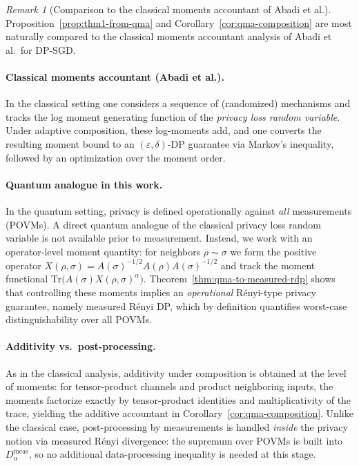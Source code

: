 \documentclass[11pt]{article}
\def\Tr{\mathrm{Tr}}
\theoremstyle{plain}
\theoremstyle{remark}
\newtheorem{remark}[theo]{Remark}
\begin{document}
\begin{remark}[Comparison to the classical moments accountant of Abadi et al.]
\label{rem:abadi-comparison}
Proposition~\ref{prop:thm1-from-qma} and Corollary~\ref{cor:qma-composition} are most
naturally compared to the classical moments accountant analysis of Abadi et al.\ for DP-SGD.

\paragraph{Classical moments accountant (Abadi et al.).}
In the classical setting one considers a sequence of (randomized) mechanisms and tracks the log
moment generating function of the \emph{privacy loss random variable}. Under adaptive composition,
these log-moments add, and one converts the resulting moment bound to an $(\varepsilon,\delta)$-DP
guarantee via Markov's inequality, followed by an optimization over the moment order.

\paragraph{Quantum analogue in this work.}
In the quantum setting, privacy is defined operationally against \emph{all} measurements (POVMs).
A direct quantum analogue of the classical privacy loss random variable is not available prior to
measurement. Instead, we work with an operator-level moment quantity:
for neighbors $\rho\sim\sigma$ we form the positive operator
$
X(\rho,\sigma)=A(\sigma)^{-1/2}A(\rho)A(\sigma)^{-1/2}
$
and track the moment functional $\Tr\!\big(A(\sigma)X(\rho,\sigma)^{\alpha}\big)$.
Theorem~\ref{thm:qma-to-measured-rdp} shows that controlling these moments implies an
\emph{operational} R\'enyi-type privacy guarantee, namely measured R\'enyi DP, which by definition
quantifies worst-case distinguishability over all POVMs.

\paragraph{Additivity vs.\ post-processing.}
As in the classical analysis, additivity under composition is obtained at the level of moments:
for tensor-product channels and product neighboring inputs, the moments factorize exactly by
tensor-product identities and multiplicativity of the trace, yielding the additive accountant in
Corollary~\ref{cor:qma-composition}.
Unlike the classical case, post-processing by measurements is handled \emph{inside} the privacy
notion via measured R\'enyi divergence: the supremum over POVMs is built into
$D^{\mathrm{meas}}_\alpha$, so no additional data-processing inequality is needed at this stage.


\end{remark}
\end{document}
